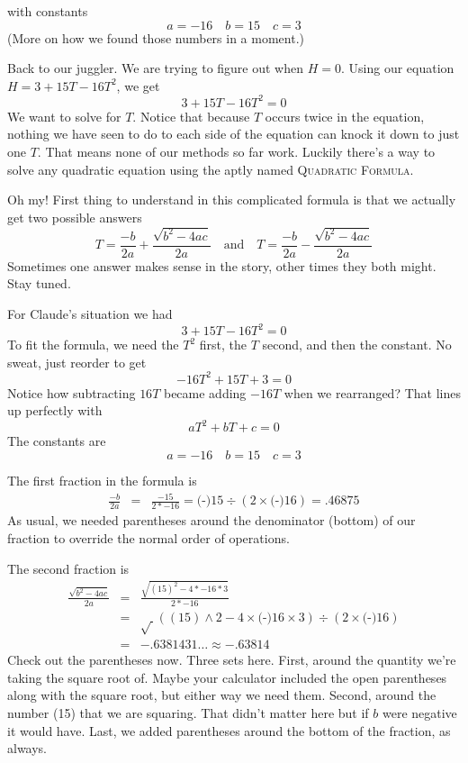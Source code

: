 \noindent with constants $$a = -16 \quad b = 15 \quad c = 3$$
(More on how we found those numbers in a moment.)

Back to our juggler.  We are trying to figure out when $H=0$.  Using our equation $H=3+15T-16T^2$, we get  
$$3+15T-16T^2=0$$ 
We want  to solve for $T$. Notice that because $T$ occurs twice in the equation, nothing we have seen to do to each side of the equation can knock it down to just one $T$. That means none of our methods so far work.  Luckily there's a way to solve any quadratic equation using the aptly named \textsc{Quadratic Formula}.  

\bigskip
\bigskip

Oh my!  First thing to understand in this complicated formula is that we actually get two possible answers $$T = \frac{-b}{2a}+ \frac{\sqrt{b^2-4ac}}{2a} \quad \text{and} \quad T = \frac{-b}{2a} - \frac{\sqrt{b^2-4ac}}{2a}$$
Sometimes one answer makes sense in the story, other times they both might.  Stay tuned.

For Claude's situation we had $$3+15T-16T^2=0$$  To fit the formula, we need the $T^2$ first, the $T$ second, and then the constant.  No sweat, just reorder to get
$$-16T^2 + 15T + 3=0$$ 
Notice how subtracting $16T$ became adding $-16T$ when we rearranged?
That lines up perfectly with $$aT^2+bT+c=0$$ The constants are $$a = -16 \quad b = 15 \quad c = 3$$ 

The first fraction in the formula is   
 \begin{eqnarray*}
\frac{-b}{2a} & = & \frac{-15}{2\ast-16} =  \text{(-)}15 \div (2 \times \text{(-)}16) = .46875
\end{eqnarray*}
As usual, we needed parentheses around the denominator (bottom) of our fraction to override the normal order of operations.  

The second fraction is \begin{eqnarray*}
\frac{\sqrt{b^2-4ac}}{2a} & = &   \frac{\sqrt{(15)^2-4 \ast -16 \ast 3}}{2 \ast-16}\\
& = &   \sqrt{~} ( (15) \wedge 2 - 4 \times  \text{(-)}16 \times 3) \div (2 \times  \text{(-)}16)\\
& =  & -.6381431\ldots \approx -.63814
\end{eqnarray*}
Check out the parentheses now.  Three sets here.  First, around the quantity we're taking the square root of.  Maybe your calculator included the open parentheses along with the square root, but either way we need them.    Second,  around the number (15) that we are squaring.  That didn't matter here but if $b$ were negative it would have. Last, we added parentheses around the bottom of the fraction, as always.

